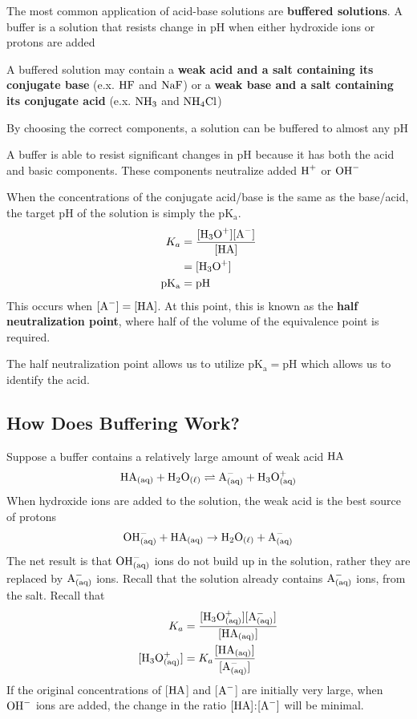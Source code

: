 The most common application of acid-base solutions are \textbf{buffered solutions}. A buffer
is a solution that resists change in pH when either hydroxide ions or protons are added
\begin{bulleted-list}
    \item A buffered solution may contain a \textbf{weak acid and a salt containing its conjugate
        base} (e.x. $\ch{HF}$ and $\ch{NaF}$) or a \textbf{weak base and a salt containing its 
        conjugate acid} (e.x. $\ch{NH3}$ and $\ch{NH4Cl}$)
    \item By choosing the correct components, a solution can be buffered to almost any pH
    \item A buffer is able to resist significant changes in pH because it has both
        the acid and basic components. These components neutralize added $\ch{H^+}$ or $\ch{OH^-}$
\end{bulleted-list}

When the concentrations of the conjugate acid/base is the same as the base/acid, the target pH
of the solution is simply the $\mathrm{pK_a}$. 
\begin{align*}
    K_a&=\frac{[\ch{H3O^+}][\ch{A^-}]}{[\ch{HA}]}\\
       &=[\ch{H3O^+}]\\
    \mathrm{pK_a}&=\mathrm{pH}
\end{align*}
This occurs when $[\ch{A^-}]=[\ch{HA}]$. At this point, this is known as the \textbf{half neutralization
point}, where half of the volume of the equivalence point is required.

\begin{important}
    The half neutralization point allows us to utilize $\mathrm{pK_a}=\mathrm{pH}$ which allows us to
    identify the acid.
\end{important}

\subsection{How Does Buffering Work?}
Suppose a buffer contains a relatively large amount of weak acid $\ch{HA}$
\[
    \ch{HA_{(aq)}}+\ch{H2O_{(\ell)}}\rightleftharpoons \ch{A^-_{(aq)}}+\ch{H3O^+_{(aq)}}
\]
When hydroxide ions are added to the solution, the weak acid is the best source of protons
\[
    \ch{OH^-_{(aq)}}+\ch{HA_{(aq)}}\to \ch{H2O_{(\ell)}}+\ch{A^-_{(aq)}}
\]
The net result is that $\ch{OH^-_{(aq)}}$ ions do not build up in the solution, rather they are
replaced by $\ch{A^-_{(aq)}}$ ions. Recall that the solution already contains $\ch{A^-_{(aq)}}$
ions, from the salt. Recall that
\begin{align*}
    K_a&=\frac{[\ch{H3O^+_{(aq)}}][\ch{A^-_{(aq)}}]}{[\ch{HA_{(aq)}}]}\\
    [\ch{H3O^+_{(aq)}}]&=K_a\frac{[\ch{HA_{(aq)}}]}{[\ch{A^-_{(aq)}}]}
\end{align*}
If the original concentrations of [$\ch{HA}$] and [$\ch{A-}$] are initially very large, when
$\ch{OH^-}$ ions are added, the change in the ratio $[\ch{HA}]$:$[\ch{A^-}]$ will be minimal. 

